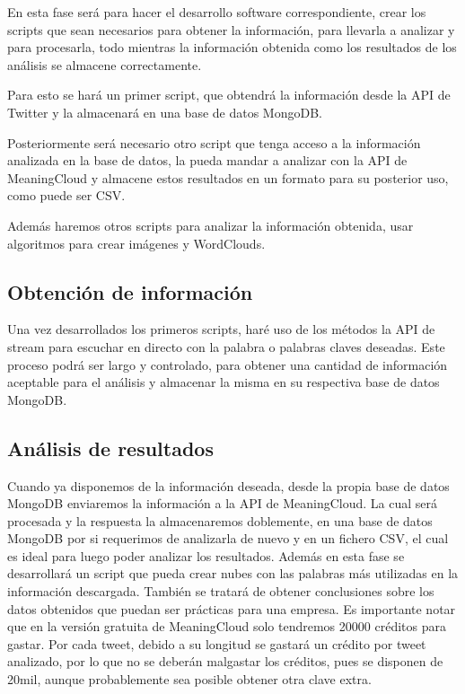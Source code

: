 En esta fase será para hacer el desarrollo software correspondiente, crear los scripts que sean necesarios para obtener la información, para llevarla a analizar y para procesarla, todo mientras la información obtenida como los resultados de los análisis se almacene correctamente.

Para esto se hará un primer script, que obtendrá la información desde la API de Twitter y la almacenará en una base de datos MongoDB. 

Posteriormente será necesario otro script que tenga acceso a la información analizada en la base de datos, la pueda mandar a analizar con la API de MeaningCloud y almacene estos resultados en un formato para su posterior uso, como puede ser CSV. 

Además haremos otros scripts para analizar la información obtenida, usar algoritmos para crear imágenes y WordClouds.  

\subsection{Obtención de información}

Una vez desarrollados los primeros scripts, haré uso de los métodos la API de stream para escuchar en directo con la palabra o palabras claves deseadas. Este proceso podrá ser largo y controlado, para obtener una cantidad de información aceptable para el análisis y almacenar la misma en su respectiva base de datos MongoDB. 

\subsection{Análisis de resultados}

Cuando ya disponemos de la información deseada, desde la propia base de datos MongoDB enviaremos la información a la API de MeaningCloud. La cual será procesada y la respuesta la almacenaremos doblemente, en una base de datos MongoDB por si requerimos de analizarla de nuevo y en un fichero CSV, el cual es ideal para luego poder analizar los resultados. Además en esta fase se desarrollará un script que pueda crear nubes con las palabras más utilizadas en la información descargada. También se tratará de obtener conclusiones sobre los datos obtenidos que puedan ser prácticas para una empresa. 
Es importante notar que en la versión gratuita de MeaningCloud solo tendremos 20000 créditos para gastar. Por cada tweet, debido a su longitud se gastará un crédito por tweet analizado, por lo que no se deberán malgastar los créditos, pues se disponen de 20mil, aunque probablemente sea posible obtener otra clave extra. 




